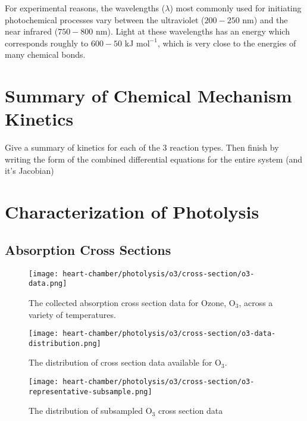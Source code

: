 For experimental reasons, the wavelengths ($\lambda$) most commonly used for initiating photochemical processes vary between the ultraviolet ($200-250$ nm) and the near infrared ($750-800$ nm). Light at these wavelengths has an energy which corresponds roughly to $600-50 $ kJ $\text{mol}^{-1}$, which is very close to the energies of many chemical bonds.



\section{Summary of Chemical Mechanism Kinetics}

Give a summary of kinetics for each of the 3 reaction types. Then finish by writing the form of the combined differential equations for the entire system (and it's Jacobian)



\section{Characterization of Photolysis}


\subsection{Absorption Cross Sections}

\begin{figure}[h]
  \centering
  \texttt{[image: heart-chamber/photolysis/o3/cross-section/o3-data.png]}
  \caption{The collected absorption cross section data for Ozone, $\mathrm{O_3}$, across a variety of temperatures.}
  \label{fig:cs-o3-data}
\end{figure}

\begin{figure}[h]
  \centering
  \texttt{[image: heart-chamber/photolysis/o3/cross-section/o3-data-distribution.png]}
  \caption{The distribution of cross section data available for $\mathrm{O_3}$.}
  \label{fig:cs-o3-dist}
\end{figure}

\begin{figure}[h]
  \centering
  \texttt{[image: heart-chamber/photolysis/o3/cross-section/o3-representative-subsample.png]}
  \caption{The distribution of subsampled $\mathrm{O}_3$ cross section data}
  \label{fig:cs-o3-repr}
\end{figure}


